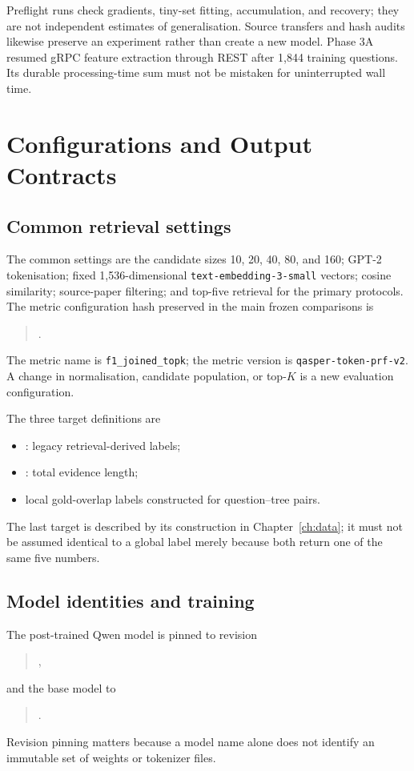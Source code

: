 Preflight runs check gradients, tiny-set fitting, accumulation, and
recovery; they are not independent estimates of generalisation.
Source transfers and hash audits likewise preserve an experiment
rather than create a new model. Phase 3A resumed gRPC feature
extraction through REST after 1,844 training questions. Its durable
processing-time sum must not be mistaken for uninterrupted wall time.

\chapter{Configurations and Output Contracts}
\label{app:protocols}

\section{Common retrieval settings}
The common settings are the candidate sizes 10, 20, 40, 80, and 160;
GPT-2 tokenisation; fixed 1,536-dimensional
\texttt{text-embedding-3-small} vectors; cosine similarity; source-paper
filtering; and top-five retrieval for the primary protocols.
The metric configuration hash preserved in the main frozen comparisons is
\begin{quote}\small
{}.
\end{quote}
The metric name is \texttt{f1\_joined\_topk}; the metric version is
\texttt{qasper-token-prf-v2}. A change in normalisation, candidate
population, or top-$K$ is a new evaluation configuration.

The three target definitions are
\begin{itemize}
\item {}: legacy retrieval-derived labels;
\item {}: total evidence length;
\item local gold-overlap labels constructed for question--tree pairs.
\end{itemize}
The last target is described by its construction in
Chapter~\ref{ch:data}; it must not be assumed identical to a global
label merely because both return one of the same five numbers.

\section{Model identities and training}
The post-trained Qwen model is pinned to revision
\begin{quote}\small
{},
\end{quote}
and the base model to
\begin{quote}\small
{}.
\end{quote}
Revision pinning matters because a model name alone does not identify
an immutable set of weights or tokenizer files.

